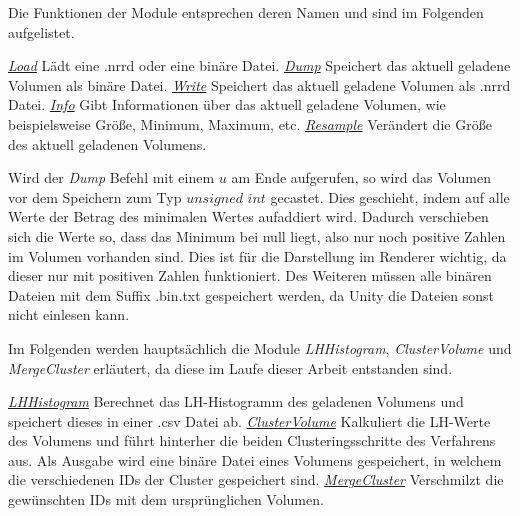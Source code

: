 Die Funktionen der Module entsprechen deren Namen und sind im Folgenden aufgelistet.


\underline{\textit{Load}}
\newline
Lädt eine .nrrd oder eine binäre Datei.
\newline
\underline{\textit{Dump}}
\newline
Speichert das aktuell geladene Volumen als binäre Datei.
\newline
\underline{\textit{Write}}
\newline
Speichert das aktuell geladene Volumen als .nrrd Datei.
\newline
\underline{\textit{Info}}
\newline
Gibt Informationen über das aktuell geladene Volumen, wie beispielsweise Größe, Minimum, Maximum, etc.
\newline
\underline{\textit{Resample}}
\newline
Verändert die Größe des aktuell geladenen Volumens.


Wird der \textit{Dump} Befehl mit einem $u$ am Ende aufgerufen, so wird das Volumen vor dem Speichern zum Typ $unsigned$ $int$ gecastet. Dies geschieht, indem auf alle Werte der Betrag des minimalen Wertes aufaddiert wird. Dadurch verschieben sich die Werte so, dass das Minimum bei null liegt, also nur noch positive Zahlen im Volumen vorhanden sind. Dies ist für die Darstellung im Renderer wichtig, da dieser nur mit positiven Zahlen funktioniert. Des Weiteren müssen alle binären Dateien mit dem Suffix .bin.txt gespeichert werden, da Unity die Dateien sonst nicht einlesen kann.


Im Folgenden werden hauptsächlich die Module \textit{LHHistogram}, \textit{ClusterVolume} und \textit{MergeCluster} erläutert, da diese im Laufe dieser Arbeit entstanden sind.


\underline{\textit{LHHistogram}}
\newline
 Berechnet das LH-Histogramm des geladenen Volumens und speichert dieses in einer .csv Datei ab.
\newline
\underline{\textit{ClusterVolume}}
\newline
Kalkuliert die LH-Werte des Volumens und führt hinterher die beiden Clusteringsschritte des Verfahrens aus. Als Ausgabe wird eine binäre Datei eines Volumens gespeichert, in welchem die verschiedenen IDs der Cluster gespeichert sind.
\newline
\underline{\textit{MergeCluster}}
\newline
Verschmilzt die gewünschten IDs mit dem ursprünglichen Volumen.

